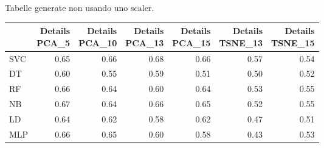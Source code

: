 \documentclass[12pt,italian]{report}
\begin{document}
Tabelle generate non usando uno scaler.
\begin{table}[h]
	\begin{center}
		\begin{adjustbox}{max width=\textwidth}
			\begin{tabular}{lrrrrrr}
				\toprule
				{} &  \thead{Details\\PCA\_5} &  \thead{Details\\PCA\_10} &  \thead{Details\\PCA\_13} &  \thead{Details\\PCA\_15} &  \thead{Details\\TSNE\_13} &  \thead{Details\\TSNE\_15} \\
				\midrule
				SVC &                  0.65 &                   0.66 &                   0.68 &                   0.66 &                    0.57 &                    0.54 \\
				DT  &                  0.60 &                   0.55 &                   0.59 &                   0.51 &                    0.50 &                    0.52 \\
				RF  &                  0.66 &                   0.64 &                   0.60 &                   0.64 &                    0.53 &                    0.55 \\
				NB  &                  0.67 &                   0.64 &                   0.66 &                   0.65 &                    0.52 &                    0.55 \\
				LD  &                  0.64 &                   0.62 &                   0.58 &                   0.62 &                    0.47 &                    0.51 \\
				MLP &                  0.66 &                   0.65 &                   0.60 &                   0.58 &                    0.43 &                    0.53 \\
				\bottomrule
			\end{tabular}
		\end{adjustbox}
	\end{center}
\end{table}
\end{document}
